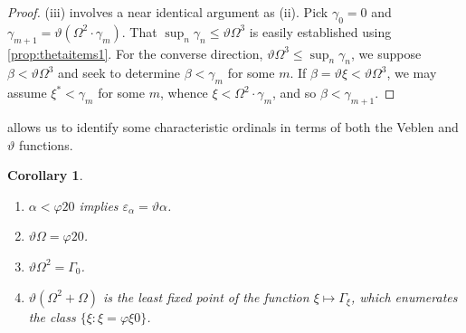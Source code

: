 \documentclass[UKenglish,cleveref,DIV=12]{scrartcl}
\newtheorem{corollary}[lemma]{Corollary}
\theoremstyle{definition}
\theoremstyle{definition}
\begin{document}
\begin{proof}
(iii) involves a near identical argument as (ii). Pick $\gamma_0=0$ and
$\gamma_{m+1}=\vartheta(\Omega^2\cdot\gamma_m)$. That
$\sup_{n}\gamma_n\le\vartheta\Omega^3$ is easily established using
\cref{prop:thetaitems1}. For the converse direction,
$\vartheta\Omega^3\le\sup_{n}\gamma_n$, we suppose $\beta<\vartheta\Omega^3$ and
seek to determine $\beta<\gamma_m$ for some $m$. If
$\beta=\vartheta\xi<\vartheta\Omega^3$, we may assume $\xi^*<\gamma_m$ for
some $m$, whence $\xi<\Omega^2\cdot\gamma_m$, and so $\beta<\gamma_{m+1}$.
%
%
%
\end{proof}
 allows us to identify some characteristic ordinals in terms of both the Veblen and $\vartheta$ functions.
\begin{corollary}\label{prop:thetaitems3}\
 \begin{enumerate}
  \item $\alpha<\varphi20$ implies $\varepsilon_\alpha=\vartheta\alpha$.
  \item $\vartheta\Omega=\varphi20$.
  \item $\vartheta\Omega^2=\Gamma_0$.
  \item $\vartheta(\Omega^2+\Omega)$ is the least fixed point of the function
	$\xi\mapsto\Gamma_\xi$, which enumerates the class $\{\xi:\xi=\varphi\xi0\}$.
 \end{enumerate}
\end{corollary}
\end{document}

